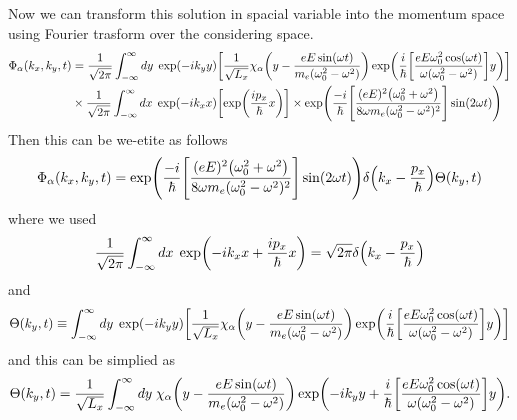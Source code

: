 \vspace{5mm}
\noindent
Now we can transform this solution in spacial variable into the momentum space using Fourier trasform over the considering space.
\begin{equation} \label{3.21}
  \begin{aligned}
    \Phi_{\alpha}(k_x,k_y,t)  &=
    \frac{1}{\sqrt{2\pi}}
    \int_{-\infty}^{\infty} dy\; \exp(-ik_y y)
    \qty[
    \frac{1}{\sqrt{L_x}}
    \chi_{\alpha}\qty(y - \frac{eE\sin(\omega t)}{m_e(\omega_0^2 - \omega^2)} )
    \exp(
     \frac{i}{\hbar}
     \qty[
     \frac{eE\omega_0^2\cos(\omega t)}{\omega(\omega_0^2 - \omega^2)}]
     y)] \\
     & \times
     \frac{1}{\sqrt{2\pi}}
     \int_{-\infty}^{\infty} dx\; \exp(-ik_x x)
     \qty[
     \exp( \frac{i p_x }{\hbar}x )
     ]
     \times
     \exp(\frac{-i}{\hbar}
     \qty[
     \frac{(eE)^2\qty(\omega_0^2 + \omega^2)}{8\omega m_e(\omega_0^2 - \omega^2)^2}
     ]\sin(2\omega t)
     )
  \end{aligned}
\end{equation}
Then this can be we-etite as follows
\begin{equation} \label{3.22}
    \Phi_{\alpha}(k_x,k_y,t)  =
    \exp(\frac{-i}{\hbar}
    \qty[
    \frac{(eE)^2\qty(\omega_0^2 + \omega^2)}{8\omega m_e(\omega_0^2 - \omega^2)^2}
    ]\sin(2\omega t))
    \delta\qty(k_x -\frac{p_x}{\hbar})
    \Theta(k_y,t)
\end{equation}
where we used
\begin{equation} \label{3.23}
  \frac{1}{\sqrt{2\pi}}
  \int_{-\infty}^{\infty} dx\;
  \exp( -ik_x x + \frac{i p_x }{\hbar}x ) =
  \sqrt{2\pi} \delta\qty(k_x -\frac{p_x}{\hbar})
\end{equation}
and
\begin{equation} \label{3.24}
  \Theta(k_y,t) \equiv
  \int_{-\infty}^{\infty} dy\; \exp(-ik_y y)
  \qty[
  \frac{1}{\sqrt{L_x}}
  \chi_{\alpha}\qty(y - \frac{eE\sin(\omega t)}{m_e(\omega_0^2 - \omega^2)} )
  \exp(
   \frac{i}{\hbar}
   \qty[
   \frac{eE\omega_0^2\cos(\omega t)}{\omega(\omega_0^2 - \omega^2)}]
   y)]
\end{equation}
and this can be simplied as
\begin{equation} \label{3.25}
  \Theta(k_y,t) =
  \frac{1}{\sqrt{L_x}}
  \int_{-\infty}^{\infty} dy\;
  \chi_{\alpha}\qty(y - \frac{eE\sin(\omega t)}{m_e(\omega_0^2 - \omega^2)} )
  \exp(
    -ik_y y +
   \frac{i}{\hbar}
   \qty[
   \frac{eE\omega_0^2\cos(\omega t)}{\omega(\omega_0^2 - \omega^2)}] y).
\end{equation}
